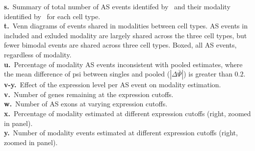 \begin{minipage}{\textwidth}
\textbf{s.}~Summary of total number of AS events identifed by \outrigger\, and their modality identified by \anchor\, for each cell type.\\
\textbf{t.}~Venn diagrams of events shared in modalities between cell types. AS events in included and exluded modality are largely shared across the three cell types, but fewer bimodal events are shared across three cell types. Boxed, all AS events, regardless of modality.\\
\textbf{u.}~Percentage of modality AS events inconsistent with pooled estimates, where the mean difference of psi between singles and pooled ($|\Delta\bar{\Psi}|$) is greater than $0.2$.
\textbf{v-y.}~Effect of the expression level per AS event on modality estimation.\\
\textbf{v.}~Number of genes remaining at the expression cutoffs.\\
\textbf{w.}~Number of AS exons at varying expression cutoffs.\\
\textbf{x.}~Percentage of modality estimated at different expression cutoffs (right, zoomed in panel).\\
\textbf{y.}~Number of modality events estimated at different expression cutoffs (right, zoomed in panel).\\
\end{minipage}




